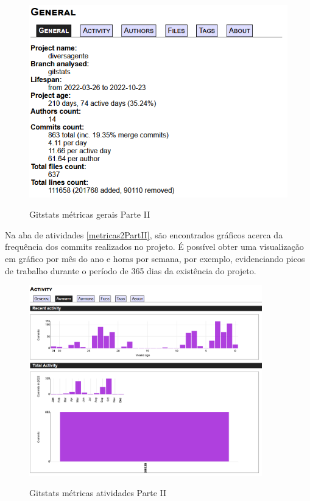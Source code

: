 \begin{figure}[htb]
	\centering
	\caption{\label{fig_arq_virado}Gitstats métricas gerais Parte II}
	\includegraphics[width=1.00\textwidth]{anexos/metricas1PartII.png}
	\label{metricas1PartII}
\end{figure}

\pagebreak

\begin{itemize}

\end{itemize}

Na aba de atividades \autoref{metricas2PartII}, são encontrados gráficos acerca da frequência dos commits realizados no projeto. É possível obter uma visualização em gráfico por mês do ano e horas por semana, por exemplo, evidenciando picos de trabalho durante o período de 365 dias da existência do projeto.

\begin{figure}[htb]
	\centering
	\caption{\label{fig_arq_virado}Gitstats métricas atividades Parte II}
	\includegraphics[width=0.90\textwidth]{anexos/metricas2PartII.png}
	\label{metricas2PartII}
\end{figure}

